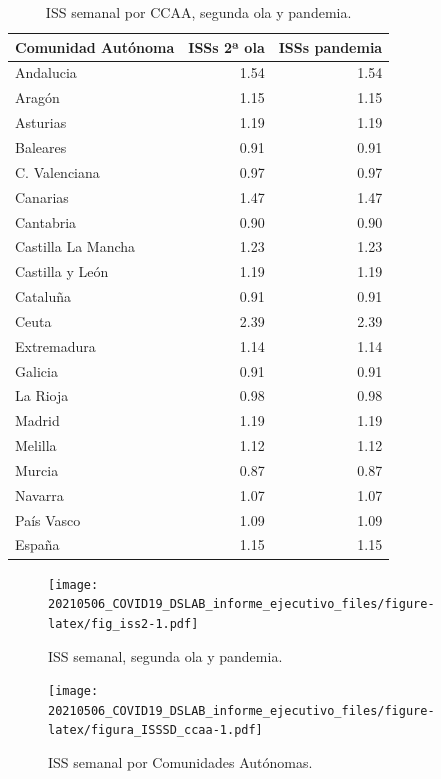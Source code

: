 \documentclass[
  11pt,
]{article}
\begin{document}
\begin{table}[!h]

\caption{\label{tab:tabla2}ISS semanal por CCAA, segunda ola y pandemia.}
\centering
\fontsize{9}{11}\selectfont
\begin{tabular}[t]{l|r|r}
\hline
Comunidad Autónoma & ISSs 2ª ola & ISSs pandemia\\
\hline
Andalucia & 1.54 & 1.54\\
\hline
Aragón & 1.15 & 1.15\\
\hline
Asturias & 1.19 & 1.19\\
\hline
Baleares & 0.91 & 0.91\\
\hline
C. Valenciana & 0.97 & 0.97\\
\hline
Canarias & 1.47 & 1.47\\
\hline
Cantabria & 0.90 & 0.90\\
\hline
Castilla La Mancha & 1.23 & 1.23\\
\hline
Castilla y León & 1.19 & 1.19\\
\hline
Cataluña & 0.91 & 0.91\\
\hline
Ceuta & 2.39 & 2.39\\
\hline
Extremadura & 1.14 & 1.14\\
\hline
Galicia & 0.91 & 0.91\\
\hline
La Rioja & 0.98 & 0.98\\
\hline
Madrid & 1.19 & 1.19\\
\hline
Melilla & 1.12 & 1.12\\
\hline
Murcia & 0.87 & 0.87\\
\hline
Navarra & 1.07 & 1.07\\
\hline
País Vasco & 1.09 & 1.09\\
\hline
España & 1.15 & 1.15\\
\hline
\end{tabular}
\end{table}

\begin{figure}
\centering
\texttt{[image: 20210506\_COVID19\_DSLAB\_informe\_ejecutivo\_files/figure-latex/fig\_iss2-1.pdf]}
\caption{\label{fig:fig_iss2} ISS semanal, segunda ola y pandemia.}
\end{figure}

\begin{figure}
\centering
\texttt{[image: 20210506\_COVID19\_DSLAB\_informe\_ejecutivo\_files/figure-latex/figura\_ISSSD\_ccaa-1.pdf]}
\caption{\label{fig:figura_ISSSD_ccaa} ISS semanal por Comunidades
Autónomas.}
\end{figure}
\end{document}
